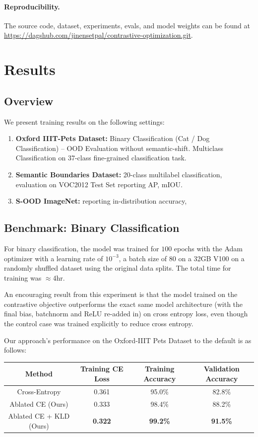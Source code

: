\documentclass{article}
\theoremstyle{plain}
\theoremstyle{definition}
\theoremstyle{remark}
\begin{document}
\paragraph{Reproducibility.} The source code, dataset, experiments, evals, and model weights can be found at \url{https://dagshub.com/jinensetpal/contrastive-optimization.git}.

\section{Results}
\label{results}

\subsection{Overview}

We present training results on the following settings:
\begin{enumerate}
	\item \textbf{Oxford IIIT-Pets Dataset:} Binary Classification (Cat / Dog Classification) -- OOD Evaluation without semantic-shift. Multiclass Classification on 37-class fine-grained classification task.
	\item \textbf{Semantic Boundaries Dataset:} 20-class multilabel classification, evaluation on VOC2012 Test Set reporting AP, mIOU.
	\item \textbf{S-OOD ImageNet:} reporting in-distribution accuracy, 
\end{enumerate}

\subsection{Benchmark: Binary Classification}

For binary classification, the model was trained for $100$ epochs with the Adam optimizer with a learning rate of $10^{-3}$, a batch size of $80$ on a 32GB V100 on a randomly shuffled dataset using the original data splits. The total time for training was $\approx$4hr.

An encouraging result from this experiment is that the model trained on the contrastive objective outperforms the exact same model architecture (with the final bias, batchnorm and ReLU re-added in) on cross entropy loss, even though the control case was trained explicitly to reduce cross entropy.

Our approach's performance on the Oxford-IIIT Pets Dataset to the default is as follows:

\begin{table}[h]
	\centering
	\begin{tabular}{c|ccc}
		\toprule
		\textbf{Method}  & \textbf{Training CE Loss}  & \textbf{Training Accuracy}   & \textbf{Validation Accuracy} \\
		\midrule
		Cross-Entropy & 0.361 & 95.0\% & 82.8\% \\
		Ablated CE (Ours) & 0.333 & 98.4\% & 88.2\% \\
		Ablated CE + KLD (Ours) & \bf 0.322 & \bf 99.2\% & \bf 91.5\% \\
		\bottomrule
	\end{tabular}
\end{table}
\end{document}
